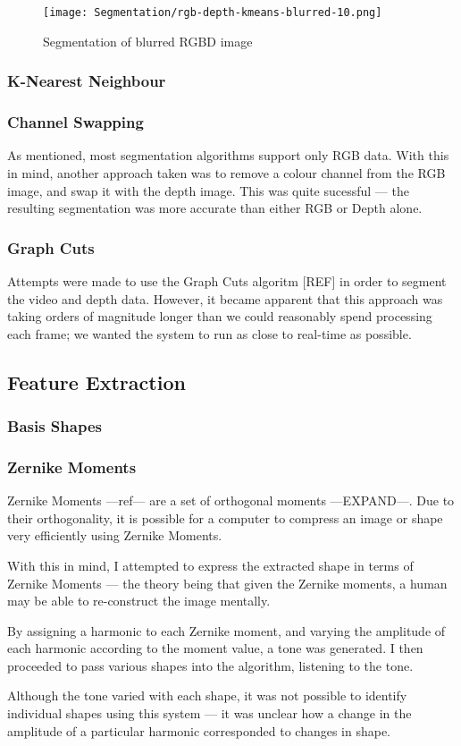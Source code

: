 \begin{figure}[H]
    \centering
    \texttt{[image: Segmentation/rgb-depth-kmeans-blurred-10.png]}
    \caption{Segmentation of blurred RGBD image}
\end{figure}

\subsubsection{K-Nearest Neighbour}

\subsubsection{Channel Swapping}
As mentioned, most segmentation algorithms support only RGB data. With this in mind, another approach taken was to remove a colour channel from the RGB image, and swap it with the depth image. This was quite sucessful --- the resulting segmentation was more accurate than either RGB or Depth alone.

\subsubsection{Graph Cuts}
Attempts were made to use the Graph Cuts algoritm [REF] in order to segment the video and depth data. However, it became apparent that this approach was taking orders of magnitude longer than we could reasonably spend processing each frame; we wanted the system to run as close to real-time as possible.

\subsection{Feature Extraction}

\subsubsection{Basis Shapes}

\subsubsection{Zernike Moments}
Zernike Moments ---ref--- are a set of orthogonal moments ---EXPAND---. Due to their orthogonality, it is possible for a computer to compress an image or shape very efficiently using Zernike Moments. 

With this in mind, I attempted to express the extracted shape in terms of Zernike Moments --- the theory being that given the Zernike moments, a human may be able to re-construct the image mentally.

By assigning a harmonic to each Zernike moment, and varying the amplitude of each harmonic according to the moment value, a tone was generated. I then proceeded to pass various shapes into the algorithm, listening to the tone.

Although the tone varied with each shape, it was not possible to identify individual shapes using this system --- it was unclear how a change in the amplitude of a particular harmonic corresponded to changes in shape. 

